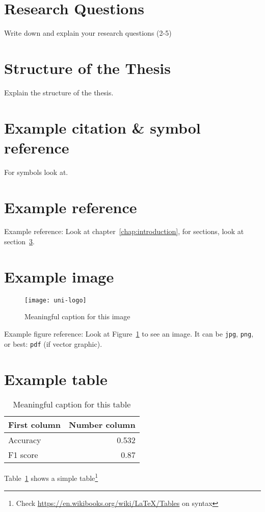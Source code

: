 \section{Research Questions}

Write down and explain your research questions (2-5)

\section{Structure of the Thesis}

Explain the structure of the thesis. 

\section{Example citation \& symbol reference}\label{sec:citation}
For symbols look at.


\section{Example reference}
Example reference: Look at chapter~\ref{chap:introduction}, for sections, look at section~\ref{sec:citation}.

\section{Example image}

\begin{figure}
	\centering
	\texttt{[image: uni-logo]}
	\caption{Meaningful caption for this image}
	\label{fig:uniLogo}
\end{figure}

Example figure reference: Look at Figure~\ref{fig:uniLogo} to see an image. It can be \texttt{jpg}, \texttt{png}, or best: \texttt{pdf} (if vector graphic).

\section{Example table}

\begin{table}
	\centering
	\begin{tabular}{lr}
		First column & Number column \\
		\hline
		Accuracy & 0.532 \\
		F1 score & 0.87
	\end{tabular}
	\caption{Meaningful caption for this table}
	\label{tab:result}
\end{table}

Table~\ref{tab:result} shows a simple table\footnote{Check \url{https://en.wikibooks.org/wiki/LaTeX/Tables} on syntax}